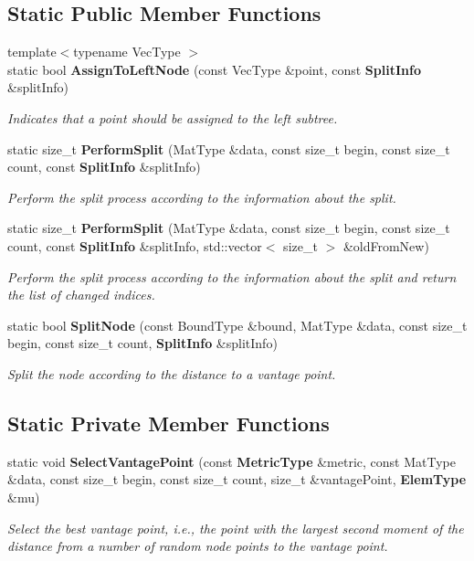 \subsection*{Static Public Member Functions}
\begin{DoxyCompactItemize}
\item 
{\footnotesize template$<$typename Vec\+Type $>$ }\\static bool {\bf Assign\+To\+Left\+Node} (const Vec\+Type \&point, const {\bf Split\+Info} \&split\+Info)
\begin{DoxyCompactList}\small\item\em Indicates that a point should be assigned to the left subtree. \end{DoxyCompactList}\item 
static size\+\_\+t {\bf Perform\+Split} (Mat\+Type \&data, const size\+\_\+t begin, const size\+\_\+t count, const {\bf Split\+Info} \&split\+Info)
\begin{DoxyCompactList}\small\item\em Perform the split process according to the information about the split. \end{DoxyCompactList}\item 
static size\+\_\+t {\bf Perform\+Split} (Mat\+Type \&data, const size\+\_\+t begin, const size\+\_\+t count, const {\bf Split\+Info} \&split\+Info, std\+::vector$<$ size\+\_\+t $>$ \&old\+From\+New)
\begin{DoxyCompactList}\small\item\em Perform the split process according to the information about the split and return the list of changed indices. \end{DoxyCompactList}\item 
static bool {\bf Split\+Node} (const Bound\+Type \&bound, Mat\+Type \&data, const size\+\_\+t begin, const size\+\_\+t count, {\bf Split\+Info} \&split\+Info)
\begin{DoxyCompactList}\small\item\em Split the node according to the distance to a vantage point. \end{DoxyCompactList}\end{DoxyCompactItemize}
\subsection*{Static Private Member Functions}
\begin{DoxyCompactItemize}
\item 
static void {\bf Select\+Vantage\+Point} (const {\bf Metric\+Type} \&metric, const Mat\+Type \&data, const size\+\_\+t begin, const size\+\_\+t count, size\+\_\+t \&vantage\+Point, {\bf Elem\+Type} \&mu)
\begin{DoxyCompactList}\small\item\em Select the best vantage point, i.\+e., the point with the largest second moment of the distance from a number of random node points to the vantage point. \end{DoxyCompactList}\end{DoxyCompactItemize}


